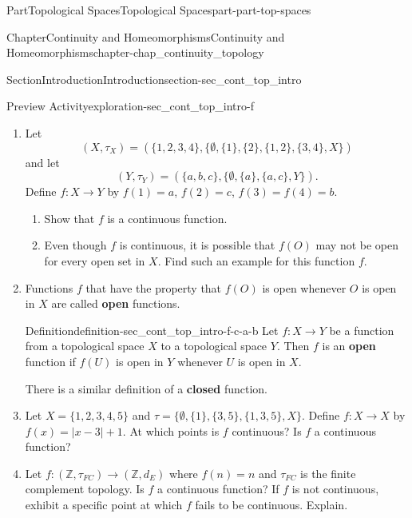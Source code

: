 \documentclass[oneside,10pt,]{book}
\newcommand{\terminology}[1]{\textbf{#1}}
\numberwithin{equation}{chapter}
\newcommand{\Z}{\mathbb{Z}}
\newcommand{\la}{\left|}
\newcommand{\ra}{\right|}
\begin{document}
\begin{partptx}{Part}{Topological Spaces}{}{Topological Spaces}{}{}{part-part-top-spaces}
\begin{chapterptx}{Chapter}{Continuity and Homeomorphisms}{}{Continuity and Homeomorphisms}{}{}{chapter-chap_continuity_topology}
\begin{sectionptx}{Section}{Introduction}{}{Introduction}{}{}{section-sec_cont_top_intro}
\begin{exploration}{Preview Activity}{}{exploration-sec_cont_top_intro-f}
\begin{enumerate}[font=\bfseries,label=(\alph*),ref=\alph*]
\begin{equation*}
\end{equation*}
Define \(f: X \to Y\) by \(f(x) = 2x\).%
\begin{enumerate}[font=\bfseries,label=(\roman*),ref=\theenumi.\roman*]%
\item{}Is \(f\) continuous at \(4\)?%
\item{}Is \(f\) a continuous function?%
\end{enumerate}%
\item{}Let%
\begin{equation*}
(X, \tau_X) = (\{1,2,3,4\}, \{\emptyset, \{1\}, \{2\}, \{1,2\}, \{3,4\}, X \})
\end{equation*}
and let%
\begin{equation*}
(Y, \tau_Y) = (\{a,b,c\}, \{\emptyset, \{a\}, \{a,c\}, Y\})\text{.}
\end{equation*}
Define \(f: X \to Y\) by \(f(1) = a\), \(f(2) = c\), \(f(3) = f(4) = b\).%
\begin{enumerate}[font=\bfseries,label=(\roman*),ref=\theenumi.\roman*]%
\item{}Show that \(f\) is a continuous function.%
\item{}Even though \(f\) is continuous, it is possible that \(f(O)\) may not be open for every open set in \(X\). Find such an example for this function \(f\).%
\end{enumerate}%
\item{}Functions \(f\) that have the property that \(f(O)\) is open whenever \(O\) is open in \(X\) are called \terminology{open} functions.%
\begin{definition}{Definition}{}{definition-sec_cont_top_intro-f-c-a-b}%
%
%
Let \(f: X \to Y\) be a function from a topological space \(X\) to a topological space \(Y\). Then \(f\) is an \terminology{open} function if \(f(U)\) is open in \(Y\) whenever \(U\) is open in \(X\).%
\end{definition}
There is a similar definition of a \terminology{closed} function.%
\item{}Let \(X= \{1,2,3,4,5\}\) and \(\tau = \{\emptyset,\{1\}, \{3,5\}, \{1,3,5\}, X\}\). Define \(f: X \to X\) by \(f(x) = \la x-3 \ra+1\). At which points is \(f\) continuous? Is \(f\) a continuous function?%
\item{}Let \(f:(\Z,\tau_{FC}) \to (\Z, d_E)\) where \(f(n) = n\) and \(\tau_{FC}\) is the finite complement topology. Is \(f\) a continuous function? If \(f\) is not continuous, exhibit a specific point at which \(f\) fails to be continuous. Explain.%

\end{enumerate}
\end{exploration}
\end{sectionptx}
\end{chapterptx}
\end{partptx}
\end{document}
